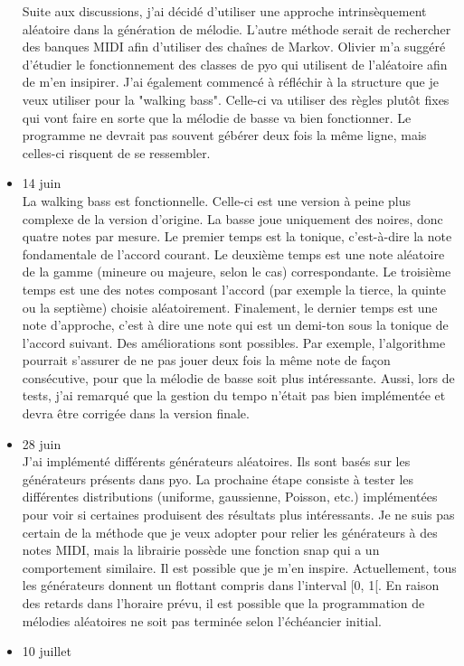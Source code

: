 \documentclass[letterpaper,12pt]{scrartcl}
\begin{document}
\begin{itemize}
Suite aux discussions, j'ai décidé d'utiliser une approche intrinsèquement aléatoire dans la génération de mélodie. L'autre méthode serait de rechercher des banques MIDI afin d'utiliser des chaînes de Markov. Olivier m'a suggéré d'étudier le fonctionnement des classes de pyo qui utilisent de l'aléatoire afin de m'en insipirer. 
J'ai également commencé à réfléchir à la structure que je veux utiliser pour la "walking bass". Celle-ci va utiliser des règles plutôt fixes qui vont faire en sorte que la mélodie de basse va bien fonctionner. Le programme ne devrait pas souvent gébérer deux fois la même ligne, mais celles-ci risquent de se ressembler.
	\item 14 juin\\
	La walking bass est fonctionnelle. Celle-ci est une version à peine plus complexe de la version d'origine. La basse joue uniquement des noires, donc quatre notes par mesure. Le premier temps est la tonique, c'est-à-dire la note fondamentale de l'accord courant. Le deuxième temps est une note aléatoire de la gamme (mineure ou majeure, selon le cas) correspondante. Le troisième temps est une des notes composant l'accord (par exemple la tierce, la quinte ou la septième) choisie aléatoirement. Finalement, le dernier temps est une note d'approche, c'est à dire une note qui est un demi-ton sous la tonique de l'accord suivant. Des améliorations sont possibles. Par exemple, l'algorithme pourrait s'assurer de ne pas jouer deux fois la même note de façon consécutive, pour que la mélodie de basse soit plus intéressante. Aussi, lors de tests, j'ai remarqué que la gestion du tempo n'était pas bien implémentée et devra être corrigée dans la version finale. 
	\item 28 juin\\
	J'ai implémenté différents générateurs aléatoires. Ils sont basés sur les générateurs présents dans pyo. La prochaine étape consiste à tester les différentes distributions (uniforme, gaussienne, Poisson, etc.) implémentées pour voir si certaines produisent des résultats plus intéressants. Je ne suis pas certain de la méthode que je veux adopter pour relier les générateurs à des notes MIDI, mais la librairie possède une fonction snap qui a un comportement similaire. Il est possible que je m'en inspire. Actuellement, tous les générateurs donnent un flottant compris dans l'interval [0, 1[. En raison des retards dans l'horaire prévu, il est possible que la programmation de mélodies aléatoires ne soit pas terminée selon l'échéancier initial.
	\item 10 juillet\\

\end{itemize}
\end{document}
